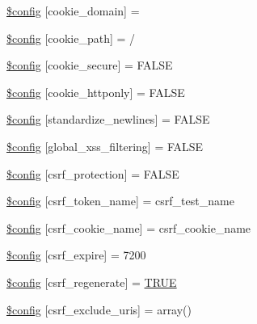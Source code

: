 \begin{DoxyCompactItemize}
\item 
\mbox{\hyperlink{config_8php_a73a43940ec583de5bcdb19c239b4510c}{\$config}} \mbox{[}\textquotesingle{}cookie\+\_\+domain\textquotesingle{}\mbox{]} = \textquotesingle{}\textquotesingle{}
\item 
\mbox{\hyperlink{config_8php_a176dd309a2f62188ff78be8a2b98eaaf}{\$config}} \mbox{[}\textquotesingle{}cookie\+\_\+path\textquotesingle{}\mbox{]} = \textquotesingle{}/\textquotesingle{}
\item 
\mbox{\hyperlink{config_8php_adbf726991c50cda563404e5162b11977}{\$config}} \mbox{[}\textquotesingle{}cookie\+\_\+secure\textquotesingle{}\mbox{]} = F\+A\+L\+SE
\item 
\mbox{\hyperlink{config_8php_adad0e1a96179de1af337c7b88104e27e}{\$config}} \mbox{[}\textquotesingle{}cookie\+\_\+httponly\textquotesingle{}\mbox{]} = F\+A\+L\+SE
\item 
\mbox{\hyperlink{config_8php_a9e3f88fcf538f3a5fc535968b36e0193}{\$config}} \mbox{[}\textquotesingle{}standardize\+\_\+newlines\textquotesingle{}\mbox{]} = F\+A\+L\+SE
\item 
\mbox{\hyperlink{config_8php_ab45064f0f597502748a1f241fc7ca8eb}{\$config}} \mbox{[}\textquotesingle{}global\+\_\+xss\+\_\+filtering\textquotesingle{}\mbox{]} = F\+A\+L\+SE
\item 
\mbox{\hyperlink{config_8php_afa3283fe6e347ec07dc24a3bddd24b9e}{\$config}} \mbox{[}\textquotesingle{}csrf\+\_\+protection\textquotesingle{}\mbox{]} = F\+A\+L\+SE
\item 
\mbox{\hyperlink{config_8php_ac474c904aeb13f7dc1cb5430a8fc9e63}{\$config}} \mbox{[}\textquotesingle{}csrf\+\_\+token\+\_\+name\textquotesingle{}\mbox{]} = \textquotesingle{}csrf\+\_\+test\+\_\+name\textquotesingle{}
\item 
\mbox{\hyperlink{config_8php_ac049a8e8df7d6ac2e8f16110f3a34709}{\$config}} \mbox{[}\textquotesingle{}csrf\+\_\+cookie\+\_\+name\textquotesingle{}\mbox{]} = \textquotesingle{}csrf\+\_\+cookie\+\_\+name\textquotesingle{}
\item 
\mbox{\hyperlink{config_8php_af11d827f96f9386ca7c873c2463df384}{\$config}} \mbox{[}\textquotesingle{}csrf\+\_\+expire\textquotesingle{}\mbox{]} = 7200
\item 
\mbox{\hyperlink{config_8php_ac0706e1569f781ed857ecc183f084c1a}{\$config}} \mbox{[}\textquotesingle{}csrf\+\_\+regenerate\textquotesingle{}\mbox{]} = \mbox{\hyperlink{constants_8php_ae04a3efe6aa42044f803ee90c2277846}{T\+R\+UE}}
\item 
\mbox{\hyperlink{config_8php_a4fa2da3e7d0304b3b81e8d9eace08891}{\$config}} \mbox{[}\textquotesingle{}csrf\+\_\+exclude\+\_\+uris\textquotesingle{}\mbox{]} = array()

\end{DoxyCompactItemize}
